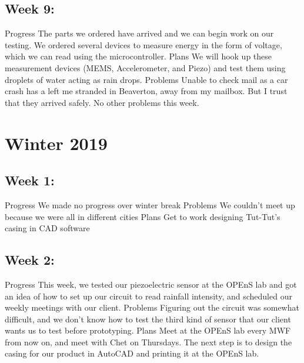 \documentclass[letterpaper,10pt,draftclsnofoot,onecolumn]{article}
\begin{document}
 
\subsection{Week 9:}
Progress
The parts we ordered have arrived and we can begin work on our testing. We ordered several devices to measure energy in the form of voltage, which we can read using the microcontroller.
\newline
Plans
We will hook up these measurement devices (MEMS, Accelerometer, and Piezo) and test them using droplets of water acting as rain drops.
\newline
Problems
Unable to check mail as a car crash has a left me stranded in Beaverton, away from my mailbox. But I trust that they arrived safely. No other problems this week.
 
\section{Winter 2019}
\subsection{Week 1:}
Progress
We made no progress over winter break
\newline
Problems
We couldn't meet up because we were all in different cities
\newline
Plans
Get to work designing Tut-Tut's casing in CAD software
 
\subsection{Week 2:}
Progress
This week, we tested our piezoelectric sensor at the OPEnS lab and got an idea of how to set up our circuit to read rainfall intensity, and scheduled our weekly meetings with our client.
\newline
Problems
Figuring out the circuit was somewhat difficult, and we don't know how to test the third kind of sensor that our client wants us to test before prototyping. 
\newline
Plans
Meet at the OPEnS lab every MWF from now on, and meet with Chet on Thursdays. The next step is to design the casing for our product in AutoCAD and printing it at the OPEnS lab.
 
\end{document}
